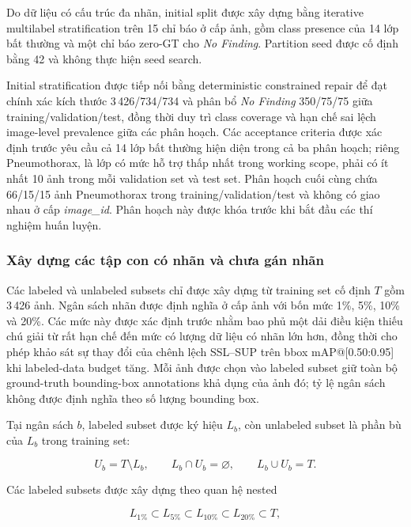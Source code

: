 \documentclass[pdflatex,sn-mathphys-num]{sn-jnl}%
\theoremstyle{thmstyleone}%
\theoremstyle{thmstyletwo}%
\theoremstyle{thmstylethree}%
\begin{document}
Do dữ liệu có cấu trúc đa nhãn, initial split được xây dựng bằng iterative
multilabel stratification trên 15 chỉ báo ở cấp ảnh, gồm class presence
của 14 lớp bất thường và một chỉ báo zero-GT cho
\textit{No Finding}. Partition seed được cố định bằng 42 và không thực
hiện seed search.

Initial stratification được tiếp nối bằng deterministic constrained repair
để đạt chính xác kích thước 3\,426/734/734 và phân bổ
\textit{No Finding} 350/75/75 giữa training/validation/test, đồng thời
duy trì class coverage và hạn chế sai lệch image-level prevalence giữa
các phân hoạch. Các acceptance criteria được xác định trước yêu cầu cả
14 lớp bất thường hiện diện trong cả ba phân hoạch; riêng Pneumothorax,
là lớp có mức hỗ trợ thấp nhất trong working scope, phải có ít nhất 10
ảnh trong mỗi validation set và test set. Phân hoạch cuối cùng chứa
66/15/15 ảnh Pneumothorax trong training/validation/test và không có
giao nhau ở cấp \textit{image\_id}. Phân hoạch này được khóa trước khi
bắt đầu các thí nghiệm huấn luyện.

\subsubsection{Xây dựng các tập con có nhãn và chưa gán nhãn}
\label{subsubsec:labeled_unlabeled_construction}

Các labeled và unlabeled subsets chỉ được xây dựng từ training set cố định
\(T\) gồm 3\,426 ảnh. Ngân sách nhãn được định nghĩa ở cấp ảnh với bốn mức
1\%, 5\%, 10\% và 20\%. Các mức này được xác định trước nhằm bao phủ một
dải điều kiện thiếu chú giải từ rất hạn chế đến mức có lượng dữ liệu có
nhãn lớn hơn, đồng thời cho phép khảo sát sự thay đổi của chênh lệch SSL--SUP trên bbox mAP@[0.50:0.95]
khi labeled-data budget tăng. Mỗi ảnh được chọn vào labeled subset giữ
toàn bộ ground-truth bounding-box annotations khả dụng của ảnh đó; tỷ lệ
ngân sách không được định nghĩa theo số lượng bounding box.

Tại ngân sách \(b\), labeled subset được ký hiệu \(L_b\), còn unlabeled
subset là phần bù của \(L_b\) trong training set:

\begin{equation}
U_b = T \setminus L_b,
\qquad
L_b \cap U_b = \varnothing,
\qquad
L_b \cup U_b = T.
\label{eq:labeled_unlabeled_complement}
\end{equation}

Các labeled subsets được xây dựng theo quan hệ nested

\begin{equation}
L_{1\%}
\subset
L_{5\%}
\subset
L_{10\%}
\subset
L_{20\%}
\subset T,
\label{eq:nested_labeled_subsets}
\end{equation}
\end{document}
